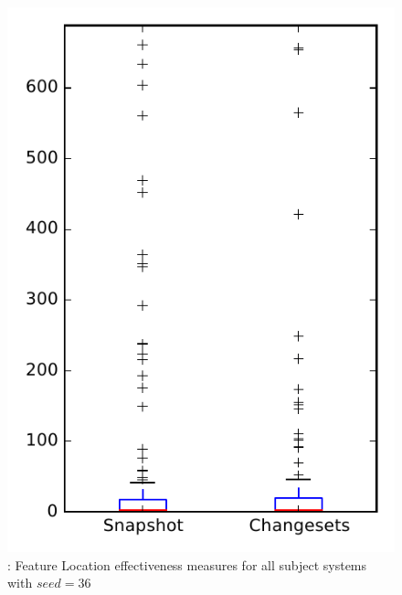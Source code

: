
\begin{figure}
\centering
\includegraphics[height=0.4\textheight]{figures/flt_seed/rq1_overview_36}
\caption{\rone: Feature Location effectiveness measures for all subject systems with $seed=36$}
\label{fig:flt_seed:rq1:overview}
\end{figure}
